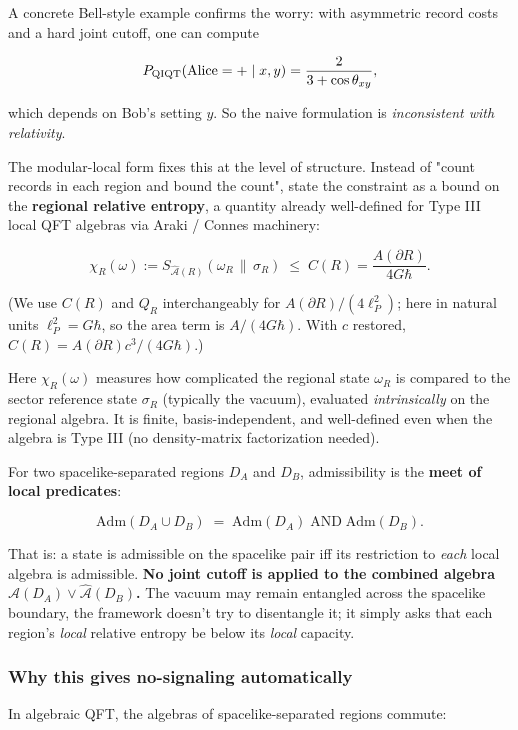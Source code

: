 \documentclass[11pt,a4paper]{article}
\begin{document}
A concrete Bell-style example confirms the worry: with asymmetric record costs and a hard joint cutoff, one can compute

\[
P_{\rm QIQT}(\text{Alice}=+ \mid x, y) = \frac{2}{3 + \cos\theta_{xy}},
\]

which depends on Bob's setting $y$. So the naive formulation is \emph{inconsistent with relativity}.

The modular-local form fixes this at the level of structure. Instead of "count records in each region and bound the count", state the constraint as a bound on the \textbf{regional relative entropy}, a quantity already well-defined for Type III local QFT algebras via Araki / Connes machinery:

\[
\chi_R(\omega) := S_{\hat{\mathcal{A}}(R)}(\omega_R \,\|\, \sigma_R) \;\le\; C(R) = \frac{A(\partial R)}{4G\hbar}.
\]

(We use $C(R)$ and $Q_R$ interchangeably for $A(\partial R)/(4\ell_P^2)$; here in natural units $\ell_P^2 = G\hbar$, so the area term is $A/(4G\hbar)$. With $c$ restored, $C(R) = A(\partial R) c^3/(4 G \hbar)$.)

Here $\chi_R(\omega)$ measures how complicated the regional state $\omega_R$ is compared to the sector reference state $\sigma_R$ (typically the vacuum), evaluated \emph{intrinsically} on the regional algebra. It is finite, basis-independent, and well-defined even when the algebra is Type III (no density-matrix factorization needed).

For two spacelike-separated regions $D_A$ and $D_B$, admissibility is the \textbf{meet of local predicates}:

\[
\mathrm{Adm}(D_A \cup D_B) \;=\; \mathrm{Adm}(D_A) \;\text{AND}\; \mathrm{Adm}(D_B).
\]

That is: a state is admissible on the spacelike pair iff its restriction to \emph{each} local algebra is admissible. \textbf{No joint cutoff is applied to the combined algebra $\hat{\mathcal{A}}(D_A) \vee \hat{\mathcal{A}}(D_B)$.} The vacuum may remain entangled across the spacelike boundary, the framework doesn't try to disentangle it; it simply asks that each region's \emph{local} relative entropy be below its \emph{local} capacity.

\subsubsection{Why this gives no-signaling automatically}

In algebraic QFT, the algebras of spacelike-separated regions commute:
\end{document}
